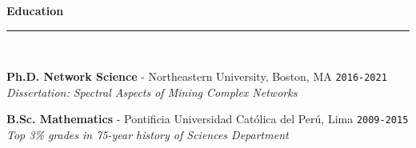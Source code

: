 \documentclass[11pt,a4paper]{article}
\newcommand{\sectiondivider}{%
    \vspace{2pt}\\%
    {\color{verdigris}\rule{30pt}{2pt}}\\%
    \vspace{8pt}%
}
\newcommand{\jobduration}[1]{%
    \textcolor{mediumgray}{\texttt{\small #1}}%
}
\newcommand{\cvsectioncustom}[1]{%
    \vspace{12pt}%
    {\Large\color{navy}\textbf{#1}}%
    \sectiondivider%
}
\begin{document}
\cvsectioncustom{Education}

\textbf{\large\color{navy}Ph.D. Network Science} - Northeastern University, Boston, MA \hfill \jobduration{2016-2021}\\
\textit{Dissertation: Spectral Aspects of Mining Complex Networks}

\vspace{6pt}

\textbf{\large\color{navy}B.Sc. Mathematics} - Pontificia Universidad Católica del Perú, Lima \hfill \jobduration{2009-2015}\\
\textit{Top 3\% grades in 75-year history of Sciences Department}
\end{document}
